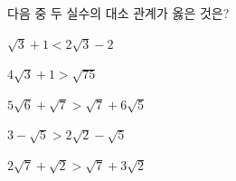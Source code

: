 다음 중 두 실수의 대소 관계가 옳은 것은?
\begin{choicesii}{\rule[-3ex]{0pt}{8ex}$\sqrt{3}+1<2\sqrt{3}-2$}{\rule[-3ex]{0pt}{8ex}$4\sqrt{3}+1>\sqrt{75}$}{\rule[-3ex]{0pt}{8ex}$5\sqrt{6}+\sqrt{7}>\sqrt{7}+6\sqrt{5}$}{\rule[-3ex]{0pt}{8ex}$3-\sqrt{5}>2\sqrt{2}-\sqrt{5}$}{\rule[-3ex]{0pt}{8ex}$2\sqrt{7}+\sqrt{2}>\sqrt{7}+3\sqrt{2}$}\end{choicesii}

